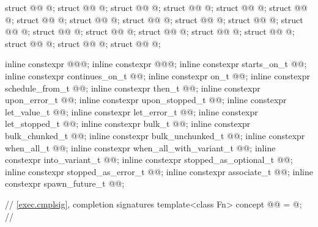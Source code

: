 \begin{codeblock}
{  struct @@ { @\unspec@ };
  struct @@ { @\unspec@ };
  struct @@ { @\unspec@ };
  struct @@ { @\unspec@ };
  struct @@ { @\unspec@ };
  struct @@ { @\unspec@ };
  struct @@ { @\unspec@ };
  struct @@ { @\unspec@ };
  struct @@ { @\unspec@ };
  struct @@ { @\unspec@ };
  struct @@ { @\unspec@ };
  struct @@ { @\unspec@ };
  struct @@ { @\unspec@ };
  struct @@ { @\unspec@ };
  struct @@ { @\unspec@ };
  struct @@ { @\unspec@ };
  struct @@ { @\unspec@ };
  struct @@ { @\unspec@ };
  struct @@ { @\unspec@ };
  struct @@ { @\unspec@ };

  inline constexpr @\unspec@ @@{};
  inline constexpr @\unspec@ @@{};
  inline constexpr starts_on_t @@{};
  inline constexpr continues_on_t @@{};
  inline constexpr on_t @@{};
  inline constexpr schedule_from_t @@{};
  inline constexpr then_t @@{};
  inline constexpr upon_error_t @@{};
  inline constexpr upon_stopped_t @@{};
  inline constexpr let_value_t @@{};
  inline constexpr let_error_t @@{};
  inline constexpr let_stopped_t @@{};
  inline constexpr bulk_t @@{};
  inline constexpr bulk_chunked_t @@{};
  inline constexpr bulk_unchunked_t @@{};
  inline constexpr when_all_t @@{};
  inline constexpr when_all_with_variant_t @@{};
  inline constexpr into_variant_t @@{};
  inline constexpr stopped_as_optional_t @@{};
  inline constexpr stopped_as_error_t @@{};
  inline constexpr associate_t @@{};
  inline constexpr spawn_future_t @@{};

  // \ref{exec.cmplsig}, completion signatures
  template<class Fn>
    concept @@ = @\seebelownc@;                   // \expos

}
\end{codeblock}

